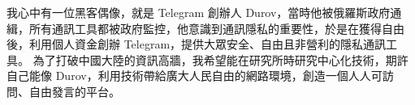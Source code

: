 \documentclass[classical]{einfart}
\begin{document}
我心中有一位黑客偶像，就是 Telegram 創辦人
Durov，當時他被俄羅斯政府通緝，所有通訊工具都被政府監控，他意識到通訊隱私的重要性，於是在獲得自由後，利用個人資金創辦
Telegram，提供大眾安全、自由且非營利的隱私通訊工具。
為了打破中國大陸的資訊高牆，我希望能在研究所時研究中心化技術，期許自己能像
Durov，利用技術帶給廣大人民自由的網路環境，創造一個人人可訪問、自由發言的平台。
\end{document}
